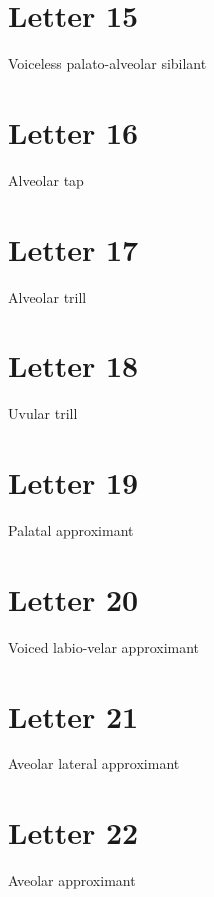 \documentclass{book}
\newcommand{\display}[1]{\begin{center}\resizebox{2cm}{!}{\texttt{[image: \#1]}}\end{center}}
\begin{document}
\display{letters/consonants/14.JPG}


\section{Letter 15}
Voiceless palato-alveolar sibilant

\display{letters/consonants/15.JPG}


\section{Letter 16}
Alveolar tap

\display{letters/consonants/16.JPG}


\section{Letter 17}
Alveolar trill

\display{letters/consonants/17.JPG}


\section{Letter 18}
Uvular trill

\display{letters/consonants/18.JPG}


\section{Letter 19}
Palatal approximant

\display{letters/consonants/19.JPG}


\section{Letter 20}
Voiced labio-velar approximant

\display{letters/consonants/20.JPG}


\section{Letter 21}
Aveolar lateral approximant

\display{letters/consonants/21.JPG}


\section{Letter 22}
Aveolar approximant

\display{letters/consonants/22.JPG}
\end{document}
